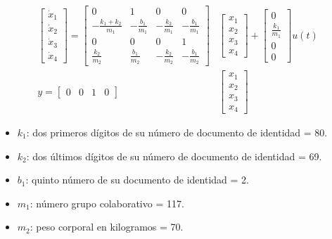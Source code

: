 \documentclass{article}
\begin{document}
\begin{enumerate}
  \begin{align}
    \begin{bmatrix}
      \dot{x}_1 \\ \dot{x}_2 \\ \dot{x}_3 \\ \dot{x}_4
    \end{bmatrix} =
    \begin{bmatrix}
      0 & 1 & 0 & 0\\
      -\frac{k_1+k_2}{m_1} & -\frac{b_1}{m_1} & -\frac{k_2}{m_1} & -\frac{b_1}{m_1}\\
      0 & 0 & 0 & 1\\
      \frac{k_2}{m_2} & \frac{b_1}{m_2} & -\frac{k_2}{m_2} & -\frac{b_1}{m_2}
    \end{bmatrix}&
    \begin{bmatrix}
      x_1 \\ x_2 \\ x_3 \\ x_4
    \end{bmatrix} + 
    \begin{bmatrix}
      0 \\ \frac{k_1}{m_1} \\ 0 \\ 0
    \end{bmatrix}
    u(t)\\
    y =
    \begin{bmatrix}
      0 & 0 & 1 & 0
    \end{bmatrix}&
    \begin{bmatrix}
      x_1 \\ x_2 \\ x_3 \\ x_4
    \end{bmatrix}
  \end{align}

  \begin{itemize}
    \item $k_1$: dos primeros dígitos de su número de documento de identidad = 80.
    \item $k_2$: dos últimos dígitos de su número de documento de identidad = 69.
    \item $b_1$: quinto número de su documento de identidad = 2.
    \item $m_1$: número grupo colaborativo = 117.
    \item $m_2$: peso corporal en kilogramos = 70.
  \end{itemize}


\end{enumerate}
\end{document}
